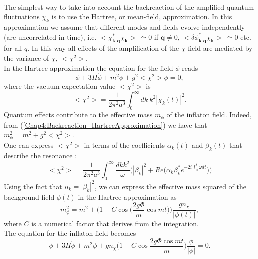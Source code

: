\documentclass[11pt,a4paper,twoside]{book}
\begin{document}
\\
The simplest way to take into account the backreaction of the amplified quantum fluctuations $ \chi_{k} $ is to use the Hartree, or mean-field, approximation. In this approximation we assume that different modes and fields evolve independently (are uncorrelated in time), i.e.
 $ <\chi^{*}_\textbf{k-q}\chi_{\textbf{k}}>\ \simeq 0 $ if $\textbf{q}\neq 0$, $<\delta \phi^{*}_\textbf{k-q}\chi_{\textbf{k}}>\ \simeq 0 $ etc. for all $ q $.  In this way all effects of the amplification of the $\chi$-field are mediated by the variance of $\chi$, $ <\chi^{2}> $. \\
In the Hartree approximation the equation for the field $\phi$ reads
\begin{equation}
\label{Chap4:Backreaction_HartreeApproximation}
\ddot{\phi} + 3H\dot{\phi} + m^{2}\phi + g^{2}<\chi^{2}>\phi=0,
\end{equation}
where the vacuum expectation value $ <\chi^{2}> $ is
\begin{equation}
\label{Chap4:Backreaction_vevChi2}
<\chi^{2}>=\frac{1}{2\pi^{2}a^{3}}\int_{0}^{\infty} dk\  k^{2}|\chi_{k}(t)|^{2}.
\end{equation}
Quantum effects contribute to the effective mass $ m_{\phi} $ of the inflaton field. Indeed, from (\ref{Chap4:Backreaction_HartreeApproximation}) we have that $ m_{\phi}^{2}=m^{2} + g^{2}<\chi^{2}> $. \\
One can express $ <\chi^{2}> $ in terms of the coefficients $ \alpha_{k}(t) $ and $\beta_{k}(t)$ that describe the resonance \cite{Chap4:LindePreheatingModel}:
\begin{equation}
\label{Chap4:Backreaction_ExpressionFluctuation}
<\chi^{2}> = \frac{1}{2\pi^{2}a^{3}}\int_{0}^{\infty} \frac{dk k^{2}}{\omega} \Bigg(|\beta_{k}|^{2} + Re\Bigg(\alpha_{k}\beta_{k}^{*}e^{-2i\int_{0}^{t} \omega dt}\Bigg)\Bigg)
\end{equation}
Using the fact that $ n_{k}=|\beta_{k}|^{2} $, we can express the effective mass squared  of the background field $\phi(t)$ in the Hartree approximation as \cite{Chap4:LindePreheatingModel}
\begin{equation}
\label{Chap4:Backreaction_EffectiveMass}
m^{2}_{\phi}=m^{2} + \Bigg(1 + C\cos\Bigg( \frac{2g\Phi}{m} \cos mt \Bigg) \Bigg) \frac{gn_{\chi}}{|\phi(t)|},
\end{equation}
where $ C $ is a numerical factor that derives from the integration. \\
The equation for the inflaton field becomes
\begin{equation}
\label{Chap4:Backreaction_equationInflaton}
\ddot{\phi} + 3H\dot{\phi} + m^{2}\phi + gn_{\chi}\Bigg(1 + C\cos \frac{2g\Phi 	\cos mt}{m}\Bigg) \frac{\phi}{|\phi|} = 0.
\end{equation}
\end{document}
